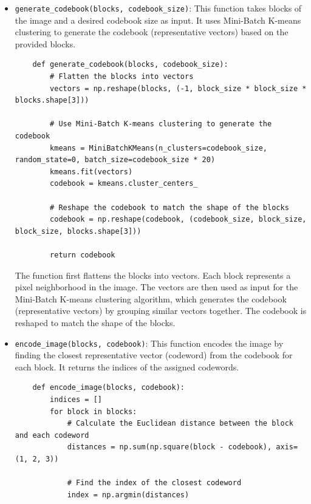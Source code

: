 \documentclass{article}
\begin{document}
\begin{itemize}
    \item \texttt{generate\_codebook(blocks, codebook\_size)}: This function takes blocks of the image and a desired codebook size as input. It uses Mini-Batch K-means clustering to generate the codebook (representative vectors) based on the provided blocks.

    \begin{code}
    \begin{verbatim}
    def generate_codebook(blocks, codebook_size):
        # Flatten the blocks into vectors
        vectors = np.reshape(blocks, (-1, block_size * block_size * blocks.shape[3]))

        # Use Mini-Batch K-means clustering to generate the codebook
        kmeans = MiniBatchKMeans(n_clusters=codebook_size, random_state=0, batch_size=codebook_size * 20)
        kmeans.fit(vectors)
        codebook = kmeans.cluster_centers_

        # Reshape the codebook to match the shape of the blocks
        codebook = np.reshape(codebook, (codebook_size, block_size, block_size, blocks.shape[3]))

        return codebook
    \end{verbatim}
    \end{code}

    The function first flattens the blocks into vectors. Each block represents a pixel neighborhood in the image. The vectors are then used as input for the Mini-Batch K-means clustering algorithm, which generates the codebook (representative vectors) by grouping similar vectors together. The codebook is reshaped to match the shape of the blocks.

    \item \texttt{encode\_image(blocks, codebook)}: This function encodes the image by finding the closest representative vector (codeword) from the codebook for each block. It returns the indices of the assigned codewords.

    \begin{code}
    \begin{verbatim}
    def encode_image(blocks, codebook):
        indices = []
        for block in blocks:
            # Calculate the Euclidean distance between the block and each codeword
            distances = np.sum(np.square(block - codebook), axis=(1, 2, 3))

            # Find the index of the closest codeword
            index = np.argmin(distances)


\end{verbatim}
\end{code}
\end{itemize}
\end{document}
